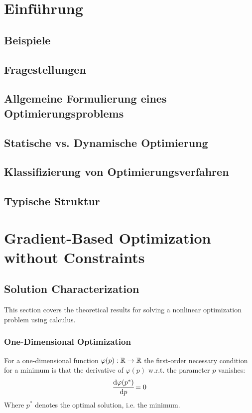 
\chapter{Einführung} %

	\section{Beispiele} %

	\section{Fragestellungen} %

	\section{Allgemeine Formulierung eines Optimierungsproblems} %

	\section{Statische vs. Dynamische Optimierung} %

	\section{Klassifizierung von Optimierungsverfahren} %

	\section{Typische Struktur} %

\chapter{Gradient-Based Optimization without Constraints}
	\section{Solution Characterization}
		This section covers the theoretical results for solving a nonlinear optimization problem using calculus.

		\subsection{One-Dimensional Optimization}
			For a one-dimensional function \( \varphi(p) : \mathbb{R} \to \mathbb{R} \) the first-order necessary condition for a minimum is that the derivative of \( \varphi(p) \) w.r.t. the parameter \(p\) vanishes:
			\begin{align*}
				\dv{\varphi(p^\ast)}{p} \! = 0
			\end{align*}
			Where \( p^\ast \) denotes the optimal solution, i.e. the minimum.

